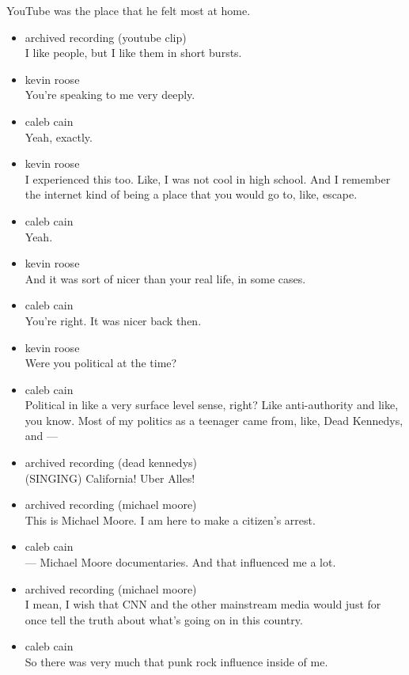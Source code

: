 YouTube was the place that he felt most at home.

\begin{itemize}
\item
  archived recording (youtube clip)\\
  I like people, but I like them in short bursts.
\item
  kevin roose\\
  You're speaking to me very deeply.
\item
  caleb cain\\
  Yeah, exactly.
\item
  kevin roose\\
  I experienced this too. Like, I was not cool in high school. And I
  remember the internet kind of being a place that you would go to,
  like, escape.
\item
  caleb cain\\
  Yeah.
\item
  kevin roose\\
  And it was sort of nicer than your real life, in some cases.
\item
  caleb cain\\
  You're right. It was nicer back then.
\item
  kevin roose\\
  Were you political at the time?
\item
  caleb cain\\
  Political in like a very surface level sense, right? Like
  anti-authority and like, you know. Most of my politics as a teenager
  came from, like, Dead Kennedys, and ---
\item
  archived recording (dead kennedys)\\
  (SINGING) California! Uber Alles!
\item
  archived recording (michael moore)\\
  This is Michael Moore. I am here to make a citizen's arrest.
\item
  caleb cain\\
  --- Michael Moore documentaries. And that influenced me a lot.
\item
  archived recording (michael moore)\\
  I mean, I wish that CNN and the other mainstream media would just for
  once tell the truth about what's going on in this country.
\item
  caleb cain\\
  So there was very much that punk rock influence inside of me.
\end{itemize}

